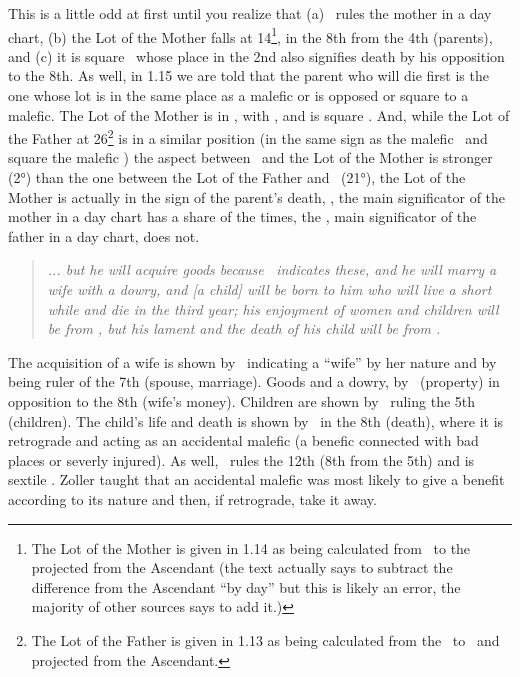 This is a little odd at first until you realize that (a) \Venus\, rules the mother in a day chart, (b) the Lot of the Mother falls at 14\Virgo\footnote{The Lot of the Mother is given in 1.14 as being calculated from \Venus\, to the \Moon\, projected from the Ascendant (the text actually says to subtract the difference from the Ascendant ``by day'' but this is likely an error, the majority of other sources says to add it.)}, in the 8th from the 4th (parents), and (c) it is square \Saturn\, whose place in the 2nd also signifies death by his opposition to the 8th. As well, in 1.15 we are told that the parent who will die first is the one whose lot is in the same place as a malefic or is opposed or square to a malefic. The Lot of the Mother is in \Virgo, with \Mars, and is square \Saturn. And, while the Lot of the Father at 26\Sagittarius\footnote{The Lot of the Father is given in 1.13 as being calculated from the \Sun\, to \Saturn\, and projected from the Ascendant.} is in a similar position (in the same sign as the malefic \Saturn\, and square the malefic \Mars) the aspect between \Saturn\, and the Lot of the Mother is stronger (2°) than the one between the Lot of the Father and \Mars\, (21°), the Lot of the Mother is actually in the sign of the parent's death, \Venus, the main significator of the mother in a day chart has a share of the times, the \Sun, main significator of the father in a day chart, does not.

\begin{quote}
\textsl{... but he will acquire goods because \Saturn\, indicates these, and he will marry a wife with a dowry, and [a child] will be born to him who will live a short while and die in the third year; his enjoyment of women and children will be from \Venus, but his lament and the death of his child will be from \Saturn.}
\end{quote}

The acquisition of a wife is shown by \Venus\, indicating a ``wife'' by her nature and by being ruler of the 7th (spouse, marriage). Goods and a dowry, by \Saturn\, (property) in opposition to the 8th (wife's money). Children are shown by \Jupiter\, ruling the 5th (children). The child's life and death is shown by \Jupiter\, in the 8th (death), where it is retrograde and acting as an accidental malefic (a benefic connected with bad places or severly injured). As well, \Venus\ rules the 12th (8th from the 5th) and is sextile \Jupiter.   Zoller taught that an accidental malefic was most likely to give a benefit according to its nature and then, if retrograde, take it away. 

